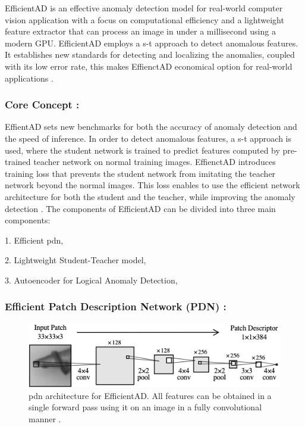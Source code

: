 EfficientAD is an effective anomaly detection model for real-world computer vision application with a focus on computational efficiency and a lightweight feature extractor that can process an image in under a millisecond using a modern GPU. EfficientAD employs a \gls{s-t} approach to detect anomalous features. It establishes new standards for detecting and localizing the anomalies, coupled with its low error rate, this makes EffienctAD economical option for real-world applications \cite{batzner2024efficientadaccuratevisualanomaly}.

\subsubsection*{Core Concept :}

EffientAD sets new benchmarks for both the accuracy of anomaly detection and the speed of inference. In order to detect anomalous features, a \gls{s-t} approach is used, where the student network is trained to predict features computed by pre-trained teacher network on normal training images. EffienctAD introduces training loss that prevents the student network from imitating the teacher network beyond the normal images. This loss enables to use the efficient network architecture for both the student and the teacher, while improving the anomaly detection \cite{batzner2024efficientadaccuratevisualanomaly}. The components of EfficientAD can be divided into three main components:

1. Efficient \gls{pdn},

2. Lightweight Student-Teacher model,

3. Autoencoder for Logical Anomaly Detection,

\subsubsection*{Efficient Patch Description Network (PDN) :}

\begin{figure}[ht!]
    \centering
    \includegraphics[width=1.1\linewidth]{Rohit_Master_Thesis//Images/pdn.png}
    \caption{\gls{pdn} architecture for EfficientAD. All features can be obtained in a single forward pass using it on an image in a fully convolutional manner \cite{batzner2024efficientadaccuratevisualanomaly}.}
    \label{fig:pdn architecture}
\end{figure}

